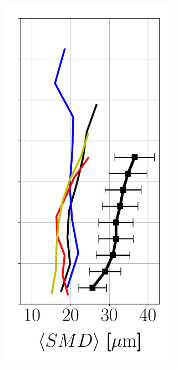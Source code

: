 \begin{figure}[h!]
\begin{subfigure}[b]{0.2\textwidth}
   \includegraphics[scale=0.35]{./part2_developments/figures_ch6_lagrangian_JICF/params_spray_velocities/profiles/SMD_along_z}
\end{subfigure}
\hspace*{0.1in}

\end{figure}
